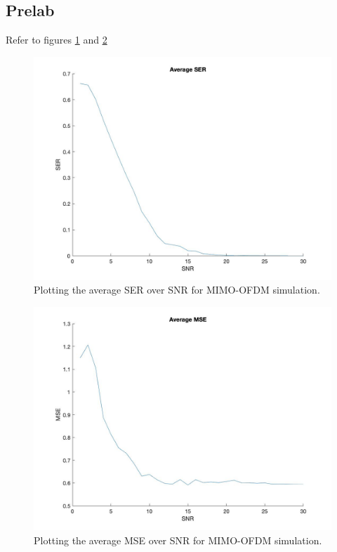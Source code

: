 \documentclass{book}
\begin{document}
\subsection{Prelab}
Refer to figures \ref{prelab1} and \ref{prelab2}
\begin{figure}
\begin{center}
\includegraphics[width=\columnwidth]{lab11/prelab1.jpg}
\caption{Plotting the average SER over SNR for MIMO-OFDM simulation.} \label{prelab1}
\end{center} 
\end{figure}
\begin{figure}
\begin{center}
\includegraphics[width=\columnwidth]{lab11/prelab2.jpg}
\caption{Plotting the average MSE over SNR for MIMO-OFDM simulation.} \label{prelab2}
\end{center} 
\end{figure}
\end{document}
